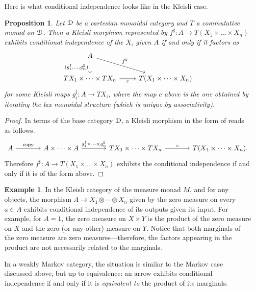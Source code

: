 \documentclass[a4paper,UKenglish,numberwithinsect,cleveref, autoref, thm-restate]{lipics-v2021}
\theoremstyle{plain} %
\newtheorem{myproposition}[mytheorem]{Proposition}
\theoremstyle{definition} %
\newtheorem{myexample}[mytheorem]{Example}
\begin{document}
Here is what conditional independence looks like in the Kleisli case.

\begin{myproposition}\label{indepkleisli}
 Let $\mathcal{D}$ be a cartesian monoidal category and $T$ a commutative monad on $\mathcal{D}$.
 Then a Kleisli morphism represented by $f^\sharp:A\to T(X_1\times\dots\times X_n)$ exhibits conditional independence of the $X_i$ given $A$ if and only if it factors as
 \[
 \begin{tikzcd}
  A \ar{d}[swap]{(g_1^\sharp,\dots,g_n^\sharp)} \ar{dr}{f^\sharp} \\
  TX_1\times\dots\times TX_n \ar{r}[swap]{c} & T(X_1\times\dots\times X_n) 
 \end{tikzcd}
 \]
 for some Kleisli maps $g_i^\sharp:A\to TX_i$,
 where the map $c$ above is the one obtained by iterating the lax monoidal structure (which is unique by associativity). 
\end{myproposition}
\begin{proof}
 In terms of the base category $\mathcal{D}$, a Kleisli morphism in the form of  reads as follows.
 \[
  \begin{tikzcd}[sep=large]
   A \ar{r}{\mathrm{copy}} & A\times\dots\times A \ar{r}{g_1^\sharp\times\dots\times g_n^\sharp} & TX_1\times\dots\times TX_n \ar{r}{c} & T(X_1\times\dots\times X_n) .
  \end{tikzcd}
 \]
 Therefore $f^\sharp:A\to T(X_1\times\dots\times X_n)$ exhibits the conditional independence if and only if it is of the form above.
\end{proof}

\begin{myexample}\label{zeromeasure}
	In the Kleisli category of the measure monad $M$, and for any objects, the morphism $A \to X_1 \otimes \cdots \otimes X_n$ given by the zero measure on every $a \in A$ exhibits conditional independence of its outputs given its input. For example, for $A=1$, the zero measure on $X\times Y$ is the product of the zero measure on $X$ and the zero (or any other) measure on $Y$.
 Notice that both marginals of the zero measure are zero measures---therefore, the factors appearing in the product are not necessarily related to the marginals.
\end{myexample}

In a weakly Markov category, the situation is similar to the Markov case discussed above,
but up to equivalence: an arrow exhibits conditional independence if and only if it is \emph{equivalent to} the product of its marginals.
\end{document}
